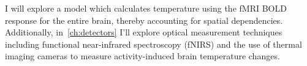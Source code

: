 I will explore a model which calculates temperature using the fMRI BOLD response for the entire brain, thereby accounting for spatial dependencies.  Additionally, in~\cref{ch:detectors} I'll explore optical measurement techniques including functional near-infrared spectroscopy (fNIRS) and the use of thermal imaging cameras to measure activity-induced brain temperature changes.